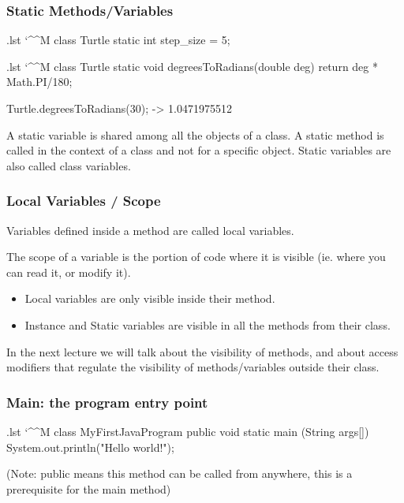 \documentclass[10pt,handout]{beamer}
\makeatletter
\newenvironment{code}{%
  \begingroup
  \@bsphack
  \immediate\openout\lstvrb@out\jobname.lst
  \let\do\@makeother\dospecials\catcode`\^^M\active
  \def\verbatim@processline{%
    \immediate\write\lstvrb@out{\the\verbatim@line}}%
  \verbatim@start}{%
  \immediate\closeout\lstvrb@out
  \@esphack
  \endgroup
  
  \begin{alertblock}{}
    
  \end{alertblock}}
\makeatother
\begin{document}
\begin{frame}
  \frametitle{Static Methods/Variables}
    \begin{code}
class Turtle {
  static int step_size = 5;
}
    \end{code}
    \pause
    \begin{code}
class Turtle {
  static void degreesToRadians(double deg) { 
    return deg * Math.PI/180; 
  }
}

Turtle.degreesToRadians(30); -> 1.0471975512

    \end{code}
    \pause
    \begin{definition}
      A static variable is shared among all the objects of a class.
      A static method is called in the context of a class and not for a specific object.
      Static variables are also called class variables.
    \end{definition}
\end{frame}

\begin{frame}
  \frametitle{Local Variables / Scope}
  \begin{definition}
    Variables defined inside a method are called local variables.

    The scope of a variable is the portion of code where it is visible (ie. where you can read it, 
    or modify it).
   \end{definition}
   
    \begin{itemize}
      \item Local variables are only visible inside their method.
      \item Instance and Static variables are visible in all the methods from their class.
    \end{itemize}

    In the next lecture we will talk about the visibility of methods, and about access modifiers
    that regulate the visibility of methods/variables outside their class. 
\end{frame}


\begin{frame}[fragile]
  \frametitle{Main: the program entry point}
  \begin{code}
    class MyFirstJavaProgram{
      public void static main (String args[]) {
        System.out.println("Hello world!");
      }
    }
  \end{code}
  (Note: public means this method can be called from anywhere, this is a prerequisite for
   the main method) 
\end{frame}
\end{document}
